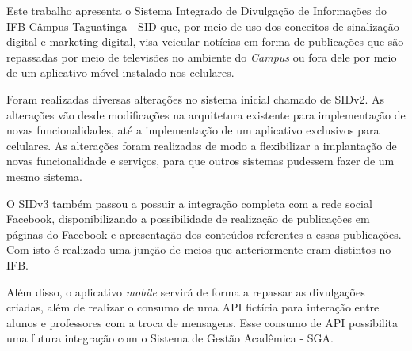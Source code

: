 \begin{resumo}
Este trabalho apresenta o Sistema Integrado de Divulgação de Informações do IFB Câmpus Taguatinga - SID que, por meio de uso dos conceitos de sinalização digital e marketing digital, visa veicular notícias em forma de publicações que são repassadas por meio de televisões no ambiente do \textit{Campus} ou fora dele por meio de um aplicativo móvel instalado nos celulares. 

Foram realizadas diversas alterações no sistema inicial chamado de SIDv2. As alterações vão desde modificações na arquitetura existente para implementação de novas funcionalidades, até a implementação de um aplicativo exclusivos para celulares. As alterações foram realizadas de modo a flexibilizar a implantação de novas funcionalidade e serviços, para que outros sistemas pudessem fazer de um mesmo sistema. 

O SIDv3 também passou a possuir a integração completa com a rede social Facebook, disponibilizando a possibilidade de realização de publicações em páginas do Facebook e apresentação dos conteúdos referentes a essas publicações. Com isto é realizado uma junção de meios que anteriormente eram distintos no IFB.

Além disso, o aplicativo \textit{mobile} servirá de forma a repassar as divulgações criadas, além de realizar o consumo de uma API fictícia para interação entre alunos e professores com a troca de mensagens. Esse consumo de API possibilita uma futura integração com o Sistema de Gestão Acadêmica - SGA.
    
 \noindent
\end{resumo}
